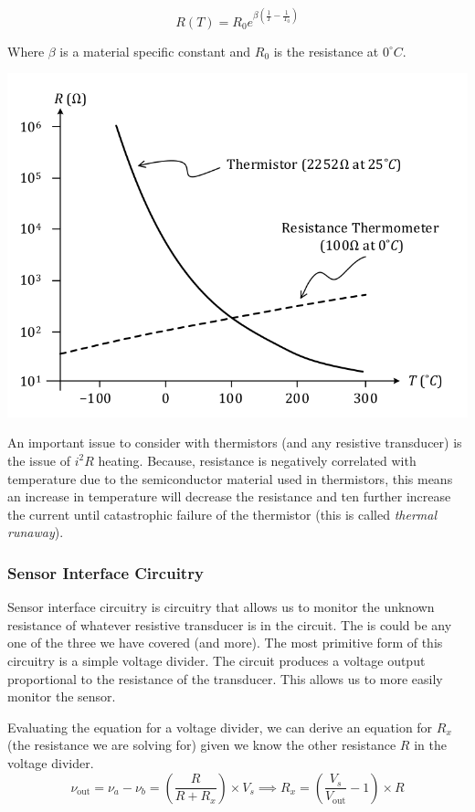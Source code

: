 \documentclass[12pt]{article}
\begin{document}
\begin{equation*}
  R(T) = R_0 e^{\beta (\frac{1}{T}-\frac{1}{T_0})}
\end{equation*}

Where $\beta$ is a material specific constant and $R_0$ is the resistance at $0^\circ C$.

\includegraphics[scale=0.3]{thermistorgraph}

An important issue to consider with thermistors (and any resistive transducer) is the issue of $i^2R$ heating. 
Because, resistance is negatively correlated with temperature due to the semiconductor material used in thermistors, this means an increase in temperature will decrease the resistance and ten further increase the current until catastrophic failure of the thermistor (this is called \textit{thermal runaway}).

\subsubsection{Sensor Interface Circuitry}
Sensor interface circuitry is circuitry that allows us to monitor the unknown resistance of whatever resistive transducer is in the circuit.
The is could be any one of the three we have covered (and more).
The most primitive form of this circuitry is a simple voltage divider.
The circuit produces a voltage output proportional to the resistance of the transducer. 
This allows us to more easily monitor the sensor. 

Evaluating the equation for a voltage divider, we can derive an equation for $R_x$ (the resistance we are solving for) given we know the other resistance $R$ in the voltage divider.
\begin{equation*}
  \nu_{\text{out}} = \nu_a - \nu_b = (\frac{R}{R+ R_x}) \times V_s \implies R_x = (\frac{V_s}{V_\text{out}}-1)\times R
\end{equation*}
\end{document}
